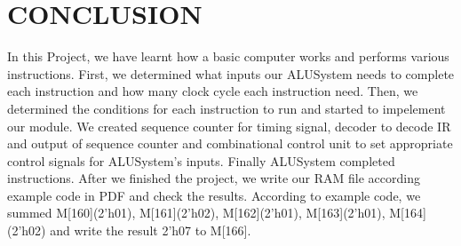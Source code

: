 \documentclass[pdftex,12pt,a4paper]{article}
\begin{document}
\section{CONCLUSION}
In this Project, we have learnt how a basic computer works and performs various instructions. First, we determined what inputs our ALUSystem needs to complete each instruction and how many clock cycle each instruction need. Then, we determined the conditions for each instruction to run and started to impelement our module. We created sequence counter for timing signal, decoder to decode IR and output of sequence counter and combinational control unit to set appropriate control signals for ALUSystem's inputs. Finally ALUSystem completed instructions. 
After we finished the project, we write our RAM file according example code in PDF and check the results. According to example code, we summed M[160](2'h01), M[161](2'h02), M[162](2'h01), M[163](2'h01), M[164](2'h02) and write the result 2'h07 to M[166].

\newpage
\end{document}
